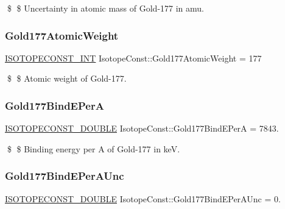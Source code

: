 \$ \$ Uncertainty in atomic mass of Gold-\/177 in amu. \mbox{\label{group___isotope_const-_gold-_au177_gafacd639aafcd55c4f0cf9a89781fdc70}} 
\subsubsection{\texorpdfstring{Gold177\+Atomic\+Weight}{Gold177AtomicWeight}}
{\footnotesize\ttfamily \mbox{\hyperlink{group___isotope_const-_macros_ga5f18360b3e99483a35c32d789e62621c}{I\+S\+O\+T\+O\+P\+E\+C\+O\+N\+S\+T\+\_\+\+I\+NT}} Isotope\+Const\+::\+Gold177\+Atomic\+Weight = 177}

\$ \$ Atomic weight of Gold-\/177. \mbox{\label{group___isotope_const-_gold-_au177_ga1e013a953dab3d0cf29db60efc38498d}} 
\subsubsection{\texorpdfstring{Gold177\+Bind\+E\+PerA}{Gold177BindEPerA}}
{\footnotesize\ttfamily \mbox{\hyperlink{group___isotope_const-_macros_ga8f45a7272ce02c0b4c65c44636ed719a}{I\+S\+O\+T\+O\+P\+E\+C\+O\+N\+S\+T\+\_\+\+D\+O\+U\+B\+LE}} Isotope\+Const\+::\+Gold177\+Bind\+E\+PerA = 7843.}

\$ \$ Binding energy per A of Gold-\/177 in keV. \mbox{\label{group___isotope_const-_gold-_au177_ga4c695f07dcdbd1962b35d97b2513ffb0}} 
\subsubsection{\texorpdfstring{Gold177\+Bind\+E\+Per\+A\+Unc}{Gold177BindEPerAUnc}}
{\footnotesize\ttfamily \mbox{\hyperlink{group___isotope_const-_macros_ga8f45a7272ce02c0b4c65c44636ed719a}{I\+S\+O\+T\+O\+P\+E\+C\+O\+N\+S\+T\+\_\+\+D\+O\+U\+B\+LE}} Isotope\+Const\+::\+Gold177\+Bind\+E\+Per\+A\+Unc = 0.}

